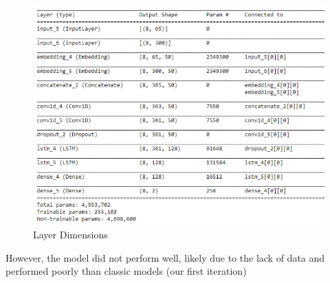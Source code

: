 \documentclass[conference]{IEEEtran}
\begin{document}
\begin{figure}[htbp]
\centerline{\includegraphics[width=1\columnwidth]{poorModel.PNG}}
\caption{Layer Dimensions}
\label{fig2}
\end{figure}



However, the model did not perform well, likely due to the lack of data and performed poorly than classic models (our first iteration)
\end{document}
